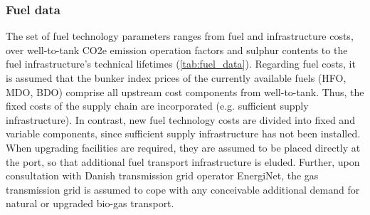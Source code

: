 \documentclass[article]{elsarticle}
\begin{document}
\subsubsection{Fuel data}
The set of fuel technology parameters ranges from fuel and infrastructure costs, over well-to-tank CO2e emission operation factors and sulphur contents to the fuel infrastructure's technical lifetimes (\cref{tab:fuel_data}). Regarding fuel costs, it is assumed that the bunker index prices of the currently available fuels (HFO, MDO, BDO) comprise all upstream cost components from well-to-tank. Thus, the fixed costs of the supply chain are incorporated (e.g. sufficient supply infrastructure). In contrast, new fuel technology costs are divided into fixed and variable components, since sufficient supply infrastructure has not been installed. When upgrading facilities are required, they are assumed to be placed directly at the port, so that additional fuel transport infrastructure is eluded. Further, upon consultation with Danish transmission grid operator EnergiNet, the gas transmission grid is assumed to cope with any conceivable additional demand for natural or upgraded bio-gas transport.
\end{document}
